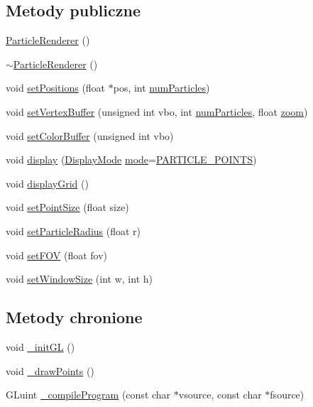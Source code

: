 \subsection*{Metody publiczne}
\begin{DoxyCompactItemize}
\item 
\hyperlink{class_particle_renderer_a1718484686c2e6db488cc88c433d03cc}{Particle\-Renderer} ()
\item 
\hyperlink{class_particle_renderer_a281be31ad850fead012460fb6675db98}{$\sim$\-Particle\-Renderer} ()
\item 
void \hyperlink{class_particle_renderer_adb3204e8af23a65b05b1aca7f43f0430}{set\-Positions} (float $\ast$pos, int \hyperlink{particles_8cpp_a05b8a90212054a3eb1a036ae0c269596}{num\-Particles})
\item 
void \hyperlink{class_particle_renderer_a396f73f6c16f24f34368557bfd5557e6}{set\-Vertex\-Buffer} (unsigned int vbo, int \hyperlink{particles_8cpp_a05b8a90212054a3eb1a036ae0c269596}{num\-Particles}, float \hyperlink{class_particle_renderer_a065df5c32be72505267048490bd0b3cf}{zoom})
\item 
void \hyperlink{class_particle_renderer_af16e23ebcee20753d86d24e4e5e32c7c}{set\-Color\-Buffer} (unsigned int vbo)
\item 
void \hyperlink{class_particle_renderer_a80b2f52dc28bb3abbde021f7fe96f8ff}{display} (\hyperlink{class_particle_renderer_a7b691afffd1abe415cb0ce17fd26f3d5}{Display\-Mode} \hyperlink{particles_8cpp_a1ea5d0cb93f22f7d0fdf804bd68c3326}{mode}=\hyperlink{class_particle_renderer_a7b691afffd1abe415cb0ce17fd26f3d5a76d84afc3ec5c09bff035fe798dacbbe}{P\-A\-R\-T\-I\-C\-L\-E\-\_\-\-P\-O\-I\-N\-T\-S})
\item 
void \hyperlink{class_particle_renderer_a0e0a5d323acf55087911ea77a2a3eafa}{display\-Grid} ()
\item 
void \hyperlink{class_particle_renderer_a68df35cdf53ad987aa6d8360b3531627}{set\-Point\-Size} (float size)
\item 
void \hyperlink{class_particle_renderer_aff09822b565b6953fc83c88bda7fa378}{set\-Particle\-Radius} (float r)
\item 
void \hyperlink{class_particle_renderer_ad6da663d3073401a776edb8dc6cf4d5f}{set\-F\-O\-V} (float fov)
\item 
void \hyperlink{class_particle_renderer_ad84b464475e5ebd42cfed6e2e91e7247}{set\-Window\-Size} (int w, int h)
\end{DoxyCompactItemize}
\subsection*{Metody chronione}
\begin{DoxyCompactItemize}
\item 
void \hyperlink{class_particle_renderer_ac75c7f73a0014333305b174b8863a46b}{\-\_\-init\-G\-L} ()
\item 
void \hyperlink{class_particle_renderer_a2683c43c010bff7973a977c1953f2bd6}{\-\_\-draw\-Points} ()
\item 
G\-Luint \hyperlink{class_particle_renderer_a3a7af352d38734b6bfa425e3b207d60b}{\-\_\-compile\-Program} (const char $\ast$vsource, const char $\ast$fsource)
\end{DoxyCompactItemize}

